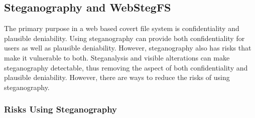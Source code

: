 \subsection{Steganography and WebStegFS}


The primary purpose in a web based covert file system is confidentiality and plausible deniability. Using steganography can provide both confidentiality for users as well as plausible deniability. However, steganography also has risks that make it vulnerable to both. Steganalysis and visible alterations\cite{PierreRicher2003} can make steganography detectable, thus removing the aspect of both confidentiality and plausible deniability. However, there are ways to reduce the risks of using steganography. 

\subsubsection{Risks Using Steganography}

